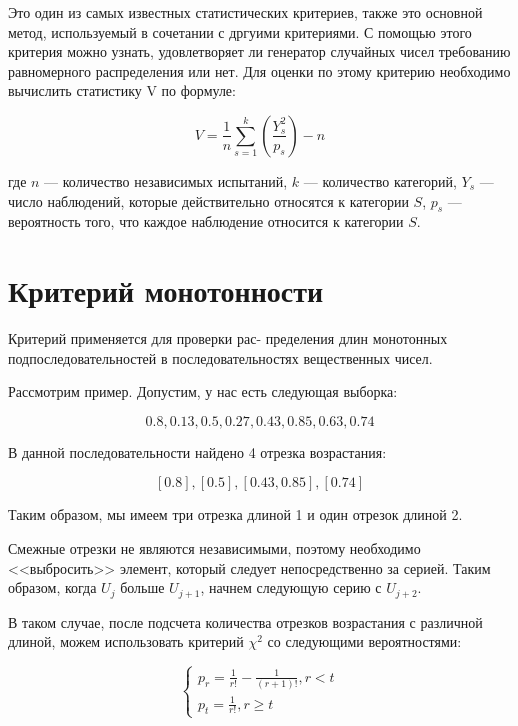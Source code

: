 Это один из самых известных статистических критериев,  также это основной метод, используемый в сочетании с дргуими критериями.
С помощью этого критерия можно узнать, удовлетворяет ли генератор случайных чисел требованию равномерного распределения или нет.
Для оценки по этому критерию необходимо вычислить статистику V по формуле:

\begin{equation}
    V = \frac{1}{n}\sum_{s=1}^k(\frac{Y_s^2}{p_s}) - n
\end{equation}

где $n$ --- количество независимых испытаний, $k$ --- количество категорий, $Y_s$ --- число наблюдений, которые действительно относятся к категории $S$,  $p_s$ --- вероятность того, что каждое наблюдение относится к категории $S$.

\section{Критерий монотонности}

Критерий применяется для проверки рас- пределения длин монотонных подпоследовательностей в последовательностях вещественных чисел.

Рассмотрим пример. Допустим, у нас есть следующая выборка: 

$$0.8, 0.13, 0.5, 0.27, 0.43, 0.85, 0.63, 0.74$$

В данной последовательности найдено 4 отрезка возрастания: 

$$[0.8], [0.5], [0.43, 0.85], [0.74]$$

Таким образом, мы имеем три отрезка длиной 1 и один отрезок длиной 2.

Смежные отрезки не являются независимыми, поэтому необходимо <<выбросить>> элемент, который следует непосредственно за серией. Таким образом, когда $U_j$ больше $U_{j+1}$, начнем следующую серию с $U_{j+2}$. 

В таком случае, после подсчета количества отрезков возрастания с различной длиной, можем использовать критерий \(\chi^2\) со следующими вероятностями:

\begin{equation}
    \begin{cases}
        p_r = \frac{1}{r!} - \frac{1}{(r + 1)!}, r < t \\
        p_t = \frac{1}{r!}, r \ge t
    \end{cases}
\end{equation}